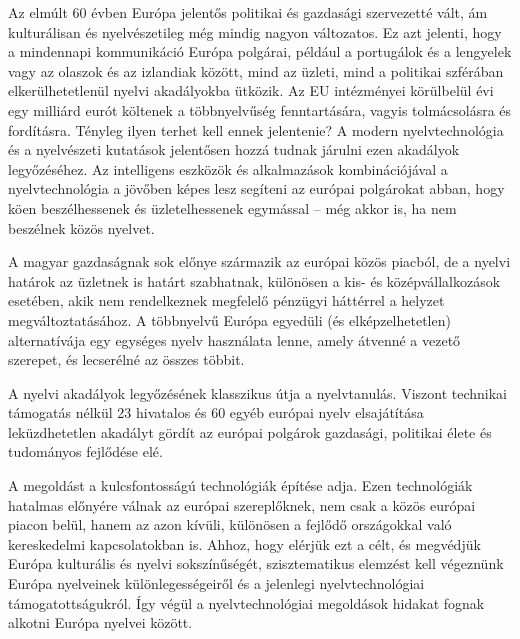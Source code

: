   \begin{multicols}{2}
  Az elmúlt 60 évben Európa jelentős politikai és gazdasági szervezetté vált, ám kulturálisan és nyelvészetileg még mindig nagyon változatos. Ez azt jelenti, hogy a mindennapi kommunikáció Európa polgárai, például a portugálok és a lengyelek vagy az olaszok és az izlandiak között, mind az üzleti, mind a politikai szférában elkerülhetetlenül nyelvi akadályokba ütközik. Az EU intézményei körülbelül évi egy milliárd eurót költenek a többnyelvűség fenntartására, vagyis tolmácsolásra és fordításra. Tényleg ilyen terhet kell ennek jelentenie? A modern nyelvtechnológia és a nyelvészeti kutatások jelentősen hozzá tudnak járulni ezen akadályok legyőzéséhez. Az intelligens eszközök és alkalmazások kombinációjával a nyelvtechnológia a jövőben képes lesz segíteni az európai polgárokat abban, hogy köen beszélhessenek és üzletelhessenek egymással -- még akkor is, ha nem beszélnek közös nyelvet.


  A magyar gazdaságnak sok előnye származik az európai közös piacból, de a nyelvi határok az üzletnek is határt szabhatnak, különösen a kis- és középvállalkozások esetében, akik nem rendelkeznek megfelelő pénzügyi háttérrel a helyzet megváltoztatásához. A többnyelvű Európa egyedüli (és elképzelhetetlen) alternatívája egy egységes nyelv használata lenne, amely átvenné a vezető szerepet, és lecserélné az összes többit. 

  A nyelvi akadályok legyőzésének klasszikus útja a nyelvtanulás. Viszont technikai támogatás nélkül 23 hivatalos és 60 egyéb európai nyelv elsajátítása leküzdhetetlen akadályt gördít az európai polgárok gazdasági, politikai élete és tudományos fej\-lődése elé. 

  A megoldást a kulcsfontosságú tech\-no\-ló\-gi\-ák építése adja. Ezen tech\-no\-ló\-gi\-ák hatalmas előnyére válnak az európai szereplőknek, nem csak a közös európai piacon belül, hanem az azon kívüli, különösen a fejlődő országokkal való kereskedelmi kapcsolatokban is. Ahhoz, hogy elérjük ezt a célt, és megvédjük Európa kulturális és nyelvi sokszínűségét, szisztematikus elemzést kell végeznünk Európa nyelveinek különlegességeiről és a jelenlegi nyelvtechnológiai támogatottságukról. Így végül a nyelvtechnológiai megoldások hidakat fognak alkotni Európa nyelvei között.  


\end{multicols}
